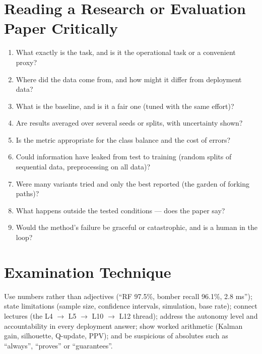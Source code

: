\documentclass[11pt]{article}
\begin{document}
\section{Reading a Research or Evaluation Paper Critically}
\begin{enumerate}
\item What exactly is the task, and is it the operational task or a convenient proxy?
\item Where did the data come from, and how might it differ from deployment data?
\item What is the baseline, and is it a fair one (tuned with the same effort)?
\item Are results averaged over several seeds or splits, with uncertainty shown?
\item Is the metric appropriate for the class balance and the cost of errors?
\item Could information have leaked from test to training (random splits of sequential data, preprocessing on all data)?
\item Were many variants tried and only the best reported (the garden of forking paths)?
\item What happens outside the tested conditions --- does the paper say?
\item Would the method's failure be graceful or catastrophic, and is a human in the loop?
\end{enumerate}

\section{Examination Technique}
Use numbers rather than adjectives (``RF 97.5\%, bomber recall 96.1\%, 2.8 ms''); state limitations (sample size, confidence intervals, simulation, base rate); connect lectures (the L4 $\to$ L5 $\to$ L10 $\to$ L12 thread); address the autonomy level and accountability in every deployment answer; show worked arithmetic (Kalman gain, silhouette, Q-update, PPV); and be suspicious of absolutes such as ``always'', ``proves'' or ``guarantees''.
\end{document}

